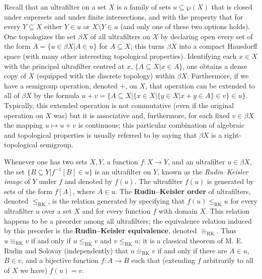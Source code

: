 \documentclass[10pt]{amsart}
\newcommand{\leqrk}[2]{#1\leq_{\mathrm{RK}}#2}
\newcommand{\eqrk}[2]{#1\equiv_{\mathrm{RK}}#2}
\theoremstyle{definition}
\theoremstyle{remark}
\begin{document}
Recall that an ultrafilter on a set $X$ is a family of sets $u\subseteq\wp(X)$ that is closed under supersets and under finite intersections, and with the property that for every $Y\subseteq X$ either $Y\in u$ or $X\setminus Y\in u$ (and only one of these two options holds). One topologizes the set $\beta X$ of all ultrafilters on $X$ by declaring open every set of the form $\overline{A}=\{u\in\beta X\big|A\in u\}$ for $A\subseteq X$; this turns $\beta X$ into a compact Hausdorff space (with many other interesting topological properties). Identifying each $x\in X$ with the principal ultrafilter centred at $x$, $\{A\subseteq X\big|x\in A\}$, one obtains a dense copy of $X$ (equipped with the discrete topology) within $\beta X$. Furthermore, if we have a semigroup operation, denoted $+$, on $X$, that operation can be extended to all of $\beta X$ by the formula $u+v=\{A\subseteq X\big|\{x\in X\big|\{y\in X\big|x+y\in A\}\in v\}\in u\}$. Typically, this extended operation is not commutative (even if the original operation on $X$ was) but it is associative and, furthermore, for each fixed $v\in\beta X$ the mapping $u\longmapsto u+v$ is continuous; this particular combination of algebraic and topological properties is usually referred to by saying that $\beta X$ is a right-topological semigroup.

Whenever one has two sets $X,Y$, a function $f:X\longrightarrow Y$, and an ultrafilter $u\in\beta X$, the set $\{B\subseteq Y\big|f^{-1}[B]\in u\}$ is an ultrafilter on $Y$, known as the {\it Rudin--Keisler image} of $Y$ under $f$ and denoted by $f(u)$. The ultrafilter $f(u)$ is generated by sets of the form $f[A]$, where $A\in u$. The {\bf Rudin--Keisler order} of ultrafilters, denoted $\leqrk{}{}$, is the relation generated by specifying that $\leqrk{f(u)}{u}$ for every ultrafilter $u$ over a set $X$ and for every function $f$ with domain $X$. This relation happens to be a preorder among all ultrafilters; the equivalence relation induced by this preorder is the {\bf Rudin--Keisler equivalence}, denoted $\eqrk{}{}$. Thus $\eqrk{u}{v}$ if and only if $\leqrk{u}{v}$ and $\leqrk{v}{u}$; it is a classical theorem of M. E. Rudin and Solovay (independently) that $\eqrk{u}{v}$ if and only if there are $A\in u$, $B\in v$, and a bijective function $f:A\longrightarrow B$ such that (extending $f$ arbitrarily to all of $X$ we have) $f(u)=v$.
\end{document}
